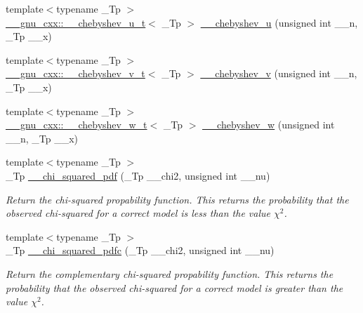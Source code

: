 \begin{DoxyCompactItemize}
\item 
{\footnotesize template$<$typename \+\_\+\+Tp $>$ }\\\hyperlink{struct____gnu__cxx_1_1____chebyshev__u__t}{\+\_\+\+\_\+gnu\+\_\+cxx\+::\+\_\+\+\_\+chebyshev\+\_\+u\+\_\+t}$<$ \+\_\+\+Tp $>$ \hyperlink{namespacestd_1_1____detail_a0ed32bbc4a1eaf32dc1dc5f423527008}{\+\_\+\+\_\+chebyshev\+\_\+u} (unsigned int \+\_\+\+\_\+n, \+\_\+\+Tp \+\_\+\+\_\+x)
\item 
{\footnotesize template$<$typename \+\_\+\+Tp $>$ }\\\hyperlink{struct____gnu__cxx_1_1____chebyshev__v__t}{\+\_\+\+\_\+gnu\+\_\+cxx\+::\+\_\+\+\_\+chebyshev\+\_\+v\+\_\+t}$<$ \+\_\+\+Tp $>$ \hyperlink{namespacestd_1_1____detail_a2ed217a1032c75d07ff34949de36d653}{\+\_\+\+\_\+chebyshev\+\_\+v} (unsigned int \+\_\+\+\_\+n, \+\_\+\+Tp \+\_\+\+\_\+x)
\item 
{\footnotesize template$<$typename \+\_\+\+Tp $>$ }\\\hyperlink{struct____gnu__cxx_1_1____chebyshev__w__t}{\+\_\+\+\_\+gnu\+\_\+cxx\+::\+\_\+\+\_\+chebyshev\+\_\+w\+\_\+t}$<$ \+\_\+\+Tp $>$ \hyperlink{namespacestd_1_1____detail_ab2a0ec347e56c0fae435c8da507c578c}{\+\_\+\+\_\+chebyshev\+\_\+w} (unsigned int \+\_\+\+\_\+n, \+\_\+\+Tp \+\_\+\+\_\+x)
\item 
{\footnotesize template$<$typename \+\_\+\+Tp $>$ }\\\+\_\+\+Tp \hyperlink{namespacestd_1_1____detail_a2125cbbc3fd3aad11c8025478c7a14fe}{\+\_\+\+\_\+chi\+\_\+squared\+\_\+pdf} (\+\_\+\+Tp \+\_\+\+\_\+chi2, unsigned int \+\_\+\+\_\+nu)
\begin{DoxyCompactList}\small\item\em Return the chi-\/squared propability function. This returns the probability that the observed chi-\/squared for a correct model is less than the value $ \chi^2 $. \end{DoxyCompactList}\item 
{\footnotesize template$<$typename \+\_\+\+Tp $>$ }\\\+\_\+\+Tp \hyperlink{namespacestd_1_1____detail_aa62c16dd75a7411400c7082e6b2b246b}{\+\_\+\+\_\+chi\+\_\+squared\+\_\+pdfc} (\+\_\+\+Tp \+\_\+\+\_\+chi2, unsigned int \+\_\+\+\_\+nu)
\begin{DoxyCompactList}\small\item\em Return the complementary chi-\/squared propability function. This returns the probability that the observed chi-\/squared for a correct model is greater than the value $ \chi^2 $. \end{DoxyCompactList}\item 

\end{DoxyCompactItemize}
